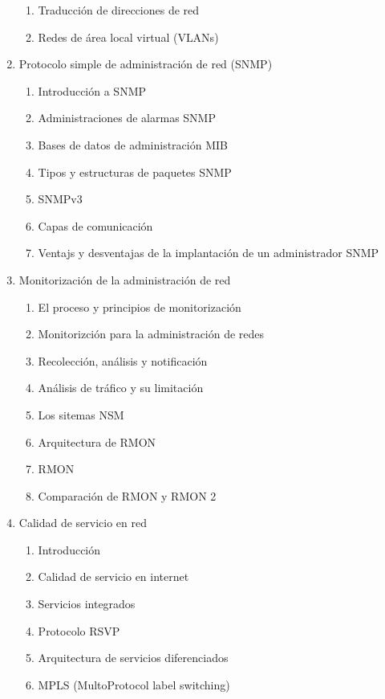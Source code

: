 \begin{enumerate}
{\begin{enumerate}
{\begin{enumerate}
                    \item{Traducción de direcciones de red}
                    \item{Redes de área local virtual (VLANs)}
                \end{enumerate}
            }
        \end{enumerate}
    }
    \item { Protocolo simple de administración de red (SNMP)
        \begin{enumerate}
            \item {Introducción a SNMP}
            \item {Administraciones de alarmas SNMP}
            \item {Bases de datos de administración MIB}
            \item {Tipos y estructuras de paquetes SNMP}
            \item {SNMPv3}
            \item {Capas de comunicación}
            \item {Ventajs y desventajas de la implantación de un administrador SNMP}
        \end{enumerate}
    }
    \item { Monitorización de la administración de red
        \begin{enumerate}
            \item {El proceso y principios de monitorización}
            \item {Monitorizción para la administración de redes}
            \item {Recolección, análisis y notificación}
            \item {Análisis de tráfico y su limitación}
            \item {Los sitemas NSM}
            \item {Arquitectura de RMON}
            \item {RMON}
            \item {Comparación de RMON y RMON 2}
        \end{enumerate}
    }

    \item{ Calidad de servicio en red
        \begin{enumerate}
            \item {Introducción}
            \item {Calidad de servicio en internet}
            \item {Servicios integrados}
            \item {Protocolo RSVP}
            \item {Arquitectura de servicios diferenciados}
            \item {MPLS (MultoProtocol label switching)}
        \end{enumerate}
    }


\end{enumerate}
